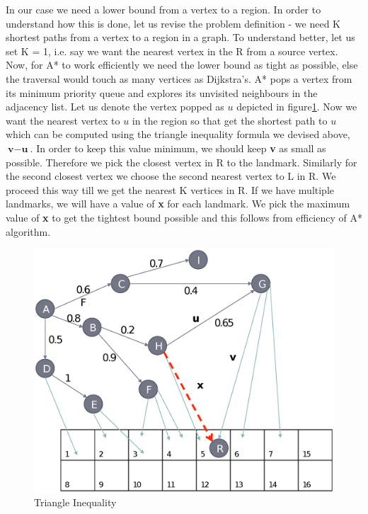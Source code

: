 {In our case we need a lower bound from a vertex to a region. In order to understand how this is done, let us revise the problem definition - we need K shortest paths from a vertex to a region in a graph. To understand better, let us set K = 1, i.e. say we want the nearest vertex in the R from a source vertex. Now, for A* to work efficiently we need the lower bound as tight as possible, else the traversal would touch as many vertices as Dijkstra's. A* pops a vertex from its minimum priority queue and explores its unvisited neighbours in the adjacency list. Let us denote the vertex popped as $u$ depicted in figure\ref{fig:tri-ine}. Now we want the nearest vertex to $u$ in the region so that get the shortest path to $u$ which can be computed using the triangle inequality formula we devised above, $\textbf{v} - \textbf{u}$. In order to keep this value minimum, we should keep \textbf{v} as small as possible. Therefore we pick the closest vertex in R to the landmark. Similarly for the second closest vertex we choose the second nearest vertex to L in R. We proceed this way till we get the nearest K vertices in R. If we have multiple landmarks, we will have a value of \textbf{x} for each landmark. We pick the maximum value of \textbf{x} to get the tightest bound possible and this follows from efficiency of A* algorithm.

\begin{figure}[h]
    \centering
    \includegraphics[width=0.75\linewidth]{images/traingle-inequality2.eps}
    \caption{Triangle Inequality}
    \label{fig:tri-ine}
\end{figure}

}

